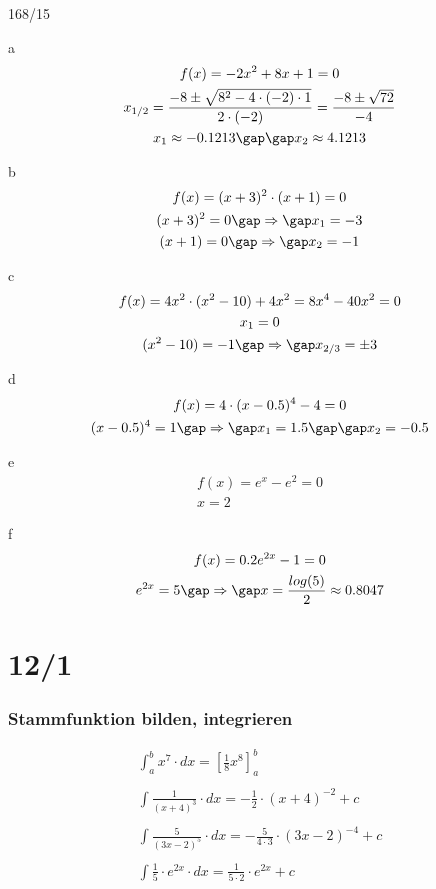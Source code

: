 \begin{exercise}{168/15}
  \item [a]
  \begin{gather*}
    f(x) = -2x^2 + 8x + 1 = 0 \\
    x_{1/2} = \frac{-8 \pm \sqrt{8^2 - 4 \cdot (-2) \cdot 1}}{2 \cdot (-2)} = \frac{-8 \pm \sqrt{72}}{-4} \\
    x_1 \approx -0.1213 \gap\gap x_2 \approx 4.1213
  \end{gather*}
  \item [b]
  \begin{gather*}
    f(x) = (x + 3)^2 \cdot (x + 1) = 0 \\
    (x + 3)^2 = 0 \gap\Rightarrow\gap x_1 = -3 \\
    (x + 1) = 0 \gap\Rightarrow\gap x_2 = -1
  \end{gather*}
  \item [c]
  \begin{gather*}
    f(x) = 4x^2 \cdot (x^2 - 10) + 4x^2 = 8x^4 - 40x^2 = 0 \\
    x_1 = 0 \\
    (x^2 - 10) = -1 \gap\Rightarrow\gap x_{2/3} = \pm 3
  \end{gather*}
  \item [d]
  \begin{gather*}
    f(x) = 4 \cdot (x - 0.5)^4 - 4 = 0 \\
    (x - 0.5)^4 = 1 \gap\Rightarrow\gap x_1 = 1.5 \gap\gap x_2 = -0.5
  \end{gather*}
  \item [e]
  \begin{gather*}
    f(x) = e^x - e^2 = 0 \\
    x = 2
  \end{gather*}
  \item [f]
  \begin{gather*}
    f(x) = 0.2e^{2x} - 1 = 0 \\
    e^{2x} = 5 \gap\Rightarrow\gap x = \frac{log(5)}{2} \approx 0.8047
  \end{gather*}
\end{exercise}

\part{12/1}

\section{Stammfunktion bilden, integrieren}
\begin{gather*}
  \int_a^b x^7 \cdot dx = \left[\frac{1}{8}x^8\right]_a^b \\\\
  \int \frac{1}{(x + 4)^3} \cdot dx = -\frac{1}{2} \cdot (x + 4)^{-2} + c \\\\
  \int \frac{5}{(3x - 2)^5} \cdot dx = -\frac{5}{4 \cdot 3} \cdot (3x - 2)^{-4} + c \\\\
  \int \frac{1}{5} \cdot e^{2x} \cdot dx = \frac{1}{5 \cdot 2} \cdot e^{2x} + c
\end{gather*}
